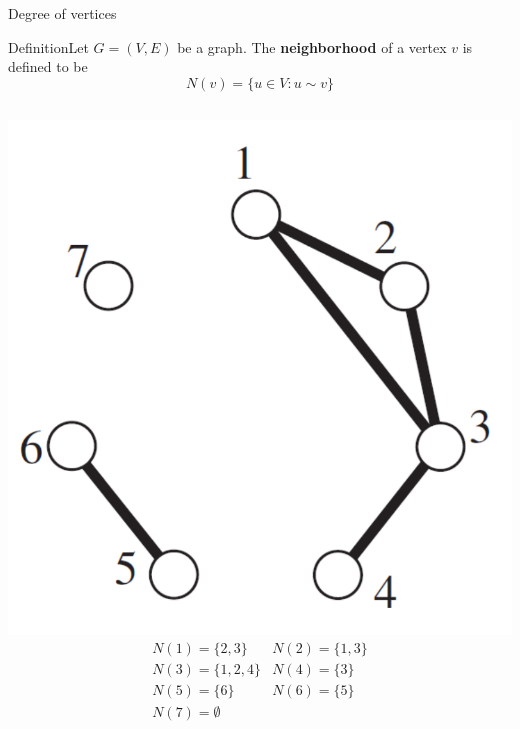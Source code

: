 \documentclass{beamer}
\def\bl[#1]#2{\begin{block}{#1}#2\end{block}}
\begin{document}
\begin{frame}{Degree of vertices}
\bl[Definition]{Let $G=(V,E)$ be a graph. The \textbf{neighborhood} of a vertex $v$ is defined to be
\[
N(v)=\{u\in V: u\sim v\}
\]}
\begin{columns}
\includegraphics[scale=0.2]{Example1Visual.pdf}
\[
\begin{array}{llll}
N(1)=\{2,3\}&N(2)=\{1,3\}\\
N(3)=\{1,2,4\}& N(4)=\{3\}\\
N(5)=\{6\}& N(6)=\{5\}\\
 N(7)=\emptyset
\end{array}
\]
\end{columns}
\end{frame}
\end{document}
